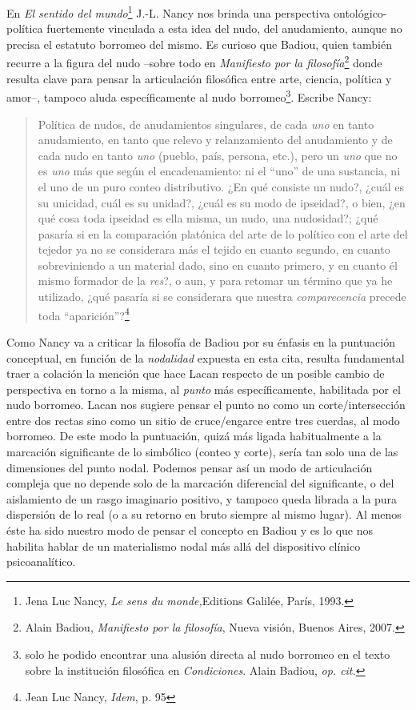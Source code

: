 En \emph{El sentido del mundo}\footnote{Jena Luc Nancy, \emph{Le sens du
  monde,}Editions Galilée, París, 1993.} J.-L. Nancy nos brinda una
perspectiva ontológico-política fuertemente vinculada a esta idea del
nudo, del anudamiento, aunque no precisa el estatuto borromeo del mismo.
Es curioso que Badiou, quien también recurre a la figura del nudo
--sobre todo en \emph{Manifiesto por la filosofía}\footnote{Alain
  Badiou, \emph{Manifiesto por la filosofía}, Nueva visión, Buenos
  Aires, 2007.} donde resulta clave para pensar la articulación
filosófica entre arte, ciencia, política y amor--, tampoco aluda
específicamente al nudo borromeo\footnote{solo he podido encontrar una
  alusión directa al nudo borromeo en el texto sobre la institución
  filosófica en \emph{Condiciones}. Alain Badiou, \emph{op. cit.}}.
Escribe Nancy:

\begin{quote}
Política de nudos, de anudamientos singulares, de cada \emph{uno} en
tanto anudamiento, en tanto que relevo y relanzamiento del anudamiento y
de cada nudo en tanto \emph{uno} (pueblo, país, persona, etc.), pero un
\emph{uno} que no es \emph{uno} más que según el encadenamiento: ni el
``uno'' de una sustancia, ni el uno de un puro conteo distributivo. ¿En
qué consiste un nudo?, ¿cuál es su unicidad, cuál es su unidad?, ¿cuál
es su modo de ipseidad?, o bien, ¿en qué cosa toda ipseidad es ella
misma, un nudo, una nudosidad?; ¿qué pasaría si en la comparación
platónica del arte de lo político con el arte del tejedor ya no se
considerara más el tejido en cuanto segundo, en cuanto sobreviniendo a
un material dado, sino en cuanto primero, y en cuanto él mismo formador
de la \emph{res}?, o aun, y para retomar un término que ya he utilizado,
¿qué pasaría si se considerara que nuestra \emph{comparecencia} precede
toda ``aparición''?\footnote{Jean Luc Nancy, \emph{Idem}, p. 95}
\end{quote}

Como Nancy va a criticar la filosofía de Badiou por su énfasis en la
puntuación conceptual, en función de la \emph{nodalidad} expuesta en
esta cita, resulta fundamental traer a colación la mención que hace
Lacan respecto de un posible cambio de perspectiva en torno a la misma,
al \emph{punto} más específicamente, habilitada por el nudo borromeo.
Lacan nos sugiere pensar el punto no como un corte/intersección entre
dos rectas sino como un sitio de cruce/engarce entre tres cuerdas, al
modo borromeo. De este modo la puntuación, quizá más ligada
habitualmente a la marcación significante de lo simbólico (conteo y
corte), sería tan solo una de las dimensiones del punto nodal. Podemos
pensar así un modo de articulación compleja que no depende solo de la
marcación diferencial del significante, o del aislamiento de un rasgo
imaginario positivo, y tampoco queda librada a la pura dispersión de lo
real (o a su retorno en bruto siempre al mismo lugar). Al menos éste ha
sido nuestro modo de pensar el concepto en Badiou y es lo que nos
habilita hablar de un materialismo nodal más allá del dispositivo
clínico psicoanalítico.

